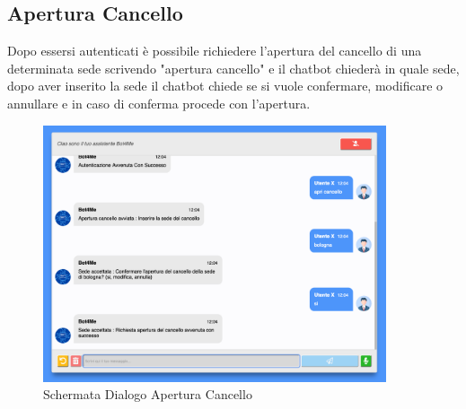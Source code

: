 \subsection{Apertura Cancello}
Dopo essersi autenticati è possibile richiedere l'apertura del cancello di una determinata sede scrivendo "apertura cancello" e il chatbot chiederà in quale sede, dopo aver inserito la sede il chatbot chiede se si vuole confermare, modificare o annullare e in caso di conferma procede con l'apertura.

\begin{figure}[H]
    \centering\includegraphics[width=0.9\textwidth, height=0.7\textheight, keepaspectratio]{images/schermata_apertura_cancello.png}
    \caption{Schermata Dialogo Apertura Cancello}
\end{figure}